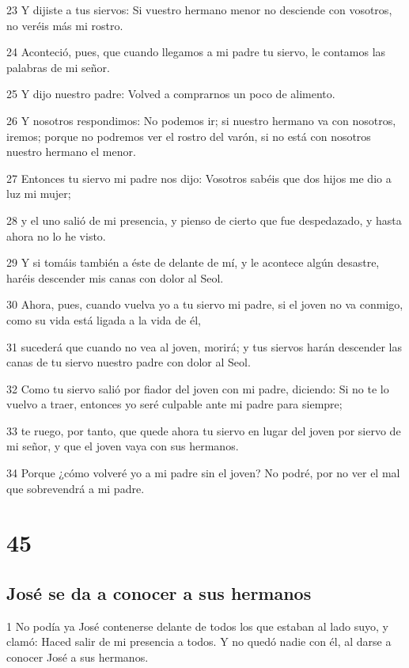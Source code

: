 23 Y dijiste a tus siervos: Si vuestro hermano menor no desciende con vosotros, no veréis más mi rostro.

24 Aconteció, pues, que cuando llegamos a mi padre tu siervo, le contamos las palabras de mi señor.

25 Y dijo nuestro padre: Volved a comprarnos un poco de alimento.

26 Y nosotros respondimos: No podemos ir; si nuestro hermano va con nosotros, iremos; porque no podremos ver el rostro del varón, si no está con nosotros nuestro hermano el menor.

27 Entonces tu siervo mi padre nos dijo: Vosotros sabéis que dos hijos me dio a luz mi mujer;

28 y el uno salió de mi presencia, y pienso de cierto que fue despedazado, y hasta ahora no lo he visto.

29 Y si tomáis también a éste de delante de mí, y le acontece algún desastre, haréis descender mis canas con dolor al Seol.

30 Ahora, pues, cuando vuelva yo a tu siervo mi padre, si el joven no va conmigo, como su vida está ligada a la vida de él,

31 sucederá que cuando no vea al joven, morirá; y tus siervos harán descender las canas de tu siervo nuestro padre con dolor al Seol.

32 Como tu siervo salió por fiador del joven con mi padre, diciendo: Si no te lo vuelvo a traer, entonces yo seré culpable ante mi padre para siempre;

33 te ruego, por tanto, que quede ahora tu siervo en lugar del joven por siervo de mi señor, y que el joven vaya con sus hermanos.

34 Porque ¿cómo volveré yo a mi padre sin el joven? No podré, por no ver el mal que sobrevendrá a mi padre.

\chapter{45}

\section{José se da a conocer a sus hermanos}

1 No podía ya José contenerse delante de todos los que estaban al lado suyo, y clamó: Haced salir de mi presencia a todos. Y no quedó nadie con él, al darse a conocer José a sus hermanos.

